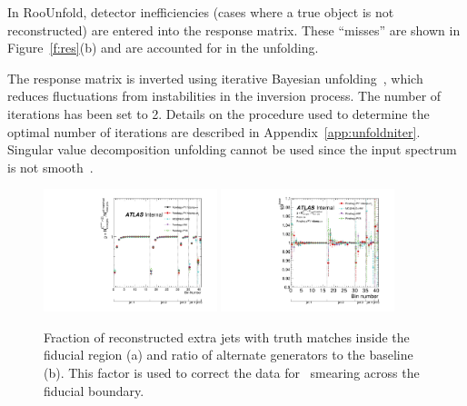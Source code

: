 In RooUnfold, detector inefficiencies (cases where a true object is not reconstructed) are entered into the response matrix.  These
``misses'' are shown in Figure~\ref{f:res}(b) and are accounted for in the unfolding. 

The response matrix is inverted using iterative Bayesian unfolding~\cite{D'Agostini:1994zf}, which reduces fluctuations from instabilities in 
the inversion process. The number of iterations has been set to 2. Details on the procedure used to determine the optimal number of iterations are described in Appendix~\ref{app:unfoldniter}. 
Singular value decomposition unfolding cannot be used since the input spectrum is not smooth~\cite{svd}.
\begin{figure}
\includegraphics[width=0.45\textwidth]{fig/Unfolding/FeedIn.pdf}
\includegraphics[width=0.45\textwidth]{fig/Unfolding/FeedInFrac.pdf}
\caption{Fraction of reconstructed extra jets with truth matches inside the fiducial region (a) and ratio of alternate generators to the baseline (b). This factor is used to correct the data for \pt\ smearing across the fiducial boundary.}
\label{fig:feedin}
\end{figure}
